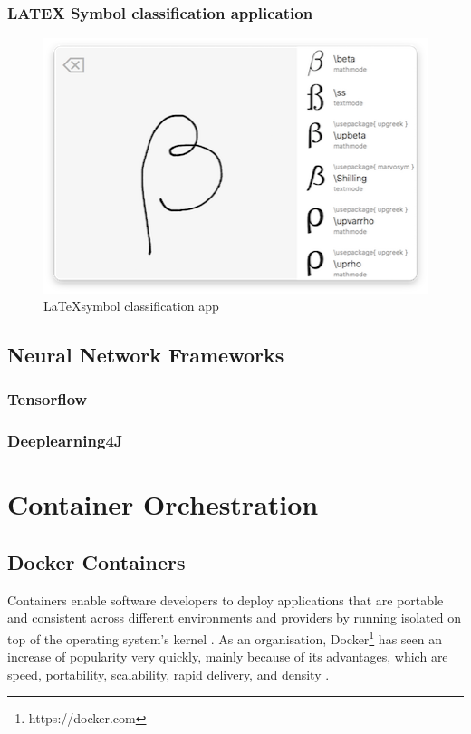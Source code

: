 \subsubsection{LATEX Symbol classification
application}\label{latex-symbol-classification-application}

\begin{figure}
\centering
\includegraphics{./images/latex-symbol-classifier.png}
\caption{\LaTeX symbol classification app}
\end{figure}

\subsection{Neural Network Frameworks}\label{neural-network-frameworks}

\subsubsection{Tensorflow}\label{tensorflow}

\subsubsection{Deeplearning4J}\label{deeplearning4j}

\section{Container Orchestration}\label{container-orchestration}

\subsection{Docker Containers}\label{docker-containers}

Containers enable software developers to deploy applications that are
portable and consistent across different environments and providers
\cite{baier-kub} by running isolated on top of the operating system's
kernel \cite{bashari}. As an organisation, Docker\footnote{https://docker.com}
has seen an increase of popularity very quickly, mainly because of its
advantages, which are speed, portability, scalability, rapid delivery,
and density \cite{bashari}.

